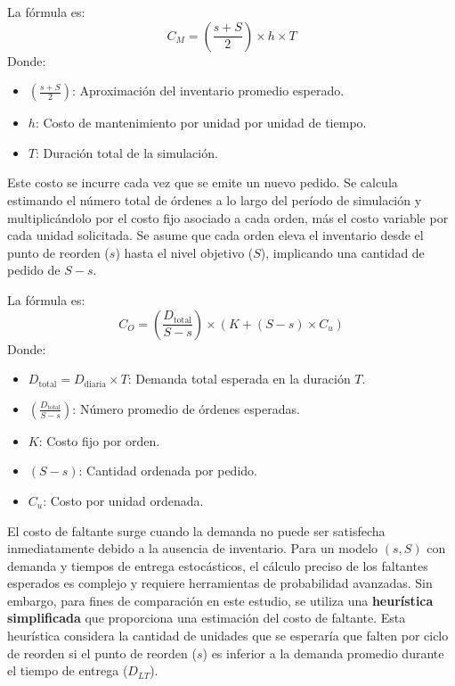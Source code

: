 \documentclass{article}
\begin{document}
La fórmula es:
$$C_M = \left( \frac{s + S}{2} \right) \times h \times T$$
Donde:
\begin{itemize}
    \item $\left( \frac{s + S}{2} \right)$: Aproximación del inventario promedio esperado.
    \item $h$: Costo de mantenimiento por unidad por unidad de tiempo.
    \item $T$: Duración total de la simulación.
\end{itemize}


Este costo se incurre cada vez que se emite un nuevo pedido. Se calcula estimando el número total de órdenes a lo largo del período de simulación y multiplicándolo por el costo fijo asociado a cada orden, más el costo variable por cada unidad solicitada. Se asume que cada orden eleva el inventario desde el punto de reorden ($s$) hasta el nivel objetivo ($S$), implicando una cantidad de pedido de $S-s$.


La fórmula es:
$$C_O = \left( \frac{D_{\text{total}}}{S - s} \right) \times (K + (S - s) \times C_u)$$
Donde:
\begin{itemize}
    \item $D_{\text{total}} = D_{\text{diaria}} \times T$: Demanda total esperada en la duración $T$.
    \item $\left( \frac{D_{\text{total}}}{S - s} \right)$: Número promedio de órdenes esperadas.
    \item $K$: Costo fijo por orden.
    \item $(S - s)$: Cantidad ordenada por pedido.
    \item $C_u$: Costo por unidad ordenada.
\end{itemize}


El costo de faltante surge cuando la demanda no puede ser satisfecha inmediatamente debido a la ausencia de inventario. Para un modelo $(s,S)$ con demanda y tiempos de entrega estocásticos, el cálculo preciso de los faltantes esperados es complejo y requiere herramientas de probabilidad avanzadas. Sin embargo, para fines de comparación en este estudio, se utiliza una \textbf{heurística simplificada} que proporciona una estimación del costo de faltante. Esta heurística considera la cantidad de unidades que se esperaría que falten por ciclo de reorden si el punto de reorden ($s$) es inferior a la demanda promedio durante el tiempo de entrega ($D_{LT}$).
\end{document}
